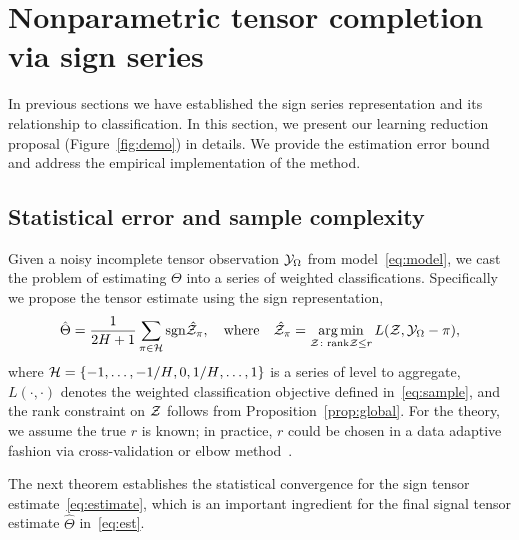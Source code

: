 \documentclass{article}
\theoremstyle{plain}
\theoremstyle{definition}
\def\sign{\textup{sgn}}
\begin{document}
\vspace{-.2cm}
\section{Nonparametric tensor completion via sign series}\label{sec:estimation}
In previous sections we have established the sign series representation and its relationship to classification. In this section, we present our learning reduction proposal (Figure~\ref{fig:demo}) in details. We provide the estimation error bound and address the empirical implementation of the method. 
\vspace{-.2cm}

\subsection{Statistical error and sample complexity}
\vspace{-.2cm}
Given a noisy incomplete tensor observation $\mathcal{Y}_\Omega$ from model~\eqref{eq:model}, we cast the problem of estimating $\Theta$ into a series of weighted classifications. Specifically we propose the tensor estimate using the sign representation,
\begin{equation}\label{eq:est}
\hat \Theta = {1\over 2H+1}\sum_{\pi \in \tH}\sign{\hat \tZ_\pi}, \quad \text{where}\quad \hat \tZ_\pi = \argmin_{\tZ\colon \text{rank}\tZ\leq r} L(\tZ, \tY_\Omega-\pi),
\end{equation}
where %
$\mathcal{H}=\{-1,\ldots,-{1/ H}, 0, {1/H},\ldots,1\}$ is a series of level to aggregate, 
$L(\cdot,\cdot)$ denotes the weighted classification objective defined in~\eqref{eq:sample}, 
and the rank constraint on $\mathcal{Z}$ follows from Proposition~\ref{prop:global}. For the theory, we assume the true $r$ is known; in practice, $r$ could be chosen in a data adaptive fashion via cross-validation or elbow method~\citep{hastie2009elements}. 

The next theorem establishes the statistical convergence for the sign tensor estimate~\eqref{eq:estimate}, which is an important ingredient for the final signal tensor estimate $\hat \Theta$ in~\eqref{eq:est}. 
\end{document}
